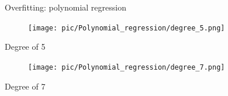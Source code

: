 \documentclass[serif, aspectratio=169]{beamer}
\begin{document}
    \begin{frame}{Overfitting: polynomial regression}
        \begin{minipage}{0.45\textwidth}
            \centering
            \begin{figure}[h]
                \texttt{[image: pic/Polynomial\_regression/degree\_5.png]}
            \end{figure}
            \begin{center}
                Degree of 5
            \end{center}
        \end{minipage}%
        \begin{minipage}{0.45\textwidth}
            \centering
            \begin{figure}[h]
                \texttt{[image: pic/Polynomial\_regression/degree\_7.png]}
            \end{figure}
            \begin{center}
                Degree of 7
            \end{center}
        \end{minipage}
        \vfill
    \end{frame}

\end{document}
